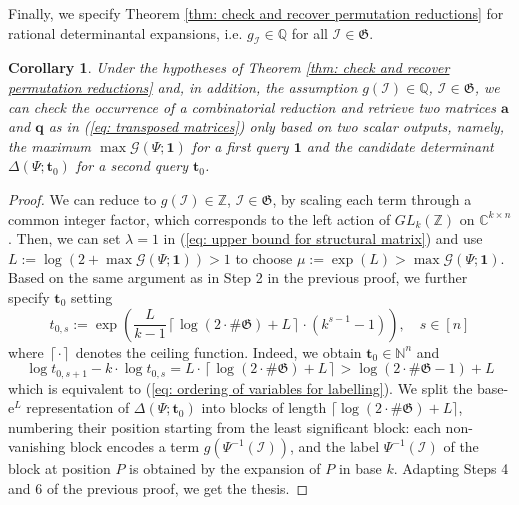 \documentclass[10pt]{article}
\newtheorem{cor}{Corollary}%
\theoremstyle{remark}%
\theoremstyle{definition}%
\begin{document}
Finally, we specify Theorem \ref{thm: check and recover permutation reductions} for rational determinantal expansions, i.e. $g_{\mathcal{I}}\in \mathbb{Q}$ for all $\mathcal{I}\in\mathfrak{G}$. 
\begin{cor}
\label{cor: combinatorial reduction from two scalars when integer}
Under the hypotheses of Theorem \ref{thm: check and recover permutation reductions} and, in addition, the assumption $g(\mathcal{I})\in\mathbb{Q}$, $\mathcal{I}\in\mathfrak{G}$, we can check the occurrence of a combinatorial reduction and retrieve two matrices $\mathbf{a}$ and $\mathbf{q}$ as in (\ref{eq: transposed matrices}) only based on two scalar outputs, namely, the maximum $\max\mathcal{G}(\Psi;\mathbf{1})$ for a first query $\mathbf{1}$ and the candidate determinant $\Delta(\Psi;\mathbf{t}_{0})$ for a second query $\mathbf{t}_{0}$.
\end{cor}
\begin{proof}
We can reduce to $g(\mathcal{I})\in\mathbb{Z}$, $\mathcal{I}\in\mathfrak{G}$, by scaling each term through a common integer factor, which corresponds to the left action of $GL_{k}(\mathbb{Z})$ on $\mathbb{C}^{k\times n}$. Then, we can set $\lambda=1$ in (\ref{eq: upper bound for structural matrix}) and use $L:=\log (2+\max\mathcal{G}(\Psi;\mathbf{1}))>1$ to choose $\mu:=\exp(L) >\max\mathcal{G}(\Psi;\mathbf{1})$. Based on the same argument as in Step 2 in the previous proof, we further specify $\mathbf{t}_{0}$ setting 
\begin{equation}
t_{0,s}:=\exp\left(\frac{L}{k-1}\left\lceil \log(2\cdot\#\mathfrak{G})+L\right\rceil \cdot(k^{s-1}-1)\right),\quad s\in[n]
\end{equation}
where $\left\lceil \cdot\right\rceil$ denotes the ceiling function. Indeed, we obtain $\mathbf{t}_{0}\in\mathbb{N}^{n}$ and 
\begin{equation}
\log t_{0,s+1}-k\cdot \log t_{0,s}=L\cdot\left\lceil \log(2\cdot\#\mathfrak{G})+L\right\rceil >\log(2\cdot\#\mathfrak{G}-1)+ L 
\end{equation} 
which is equivalent to (\ref{eq: ordering of variables for labelling}). We split the base-$\mathrm{e}^{L}$ representation of $\Delta(\Psi;\mathbf{t}_{0})$ into blocks of length $\lceil \log(2\cdot\#\mathfrak{G})+L\rceil$, numbering their position starting from the least significant block: each non-vanishing block encodes a term $g(\Psi^{-1}(\mathcal{I}))$, and the label $\Psi^{-1}(\mathcal{I})$ of the block at position $P$ is obtained by the expansion of $P$ in base $k$. Adapting Steps 4 and 6 of the previous proof, we get the thesis.
\end{proof}
\end{document}
